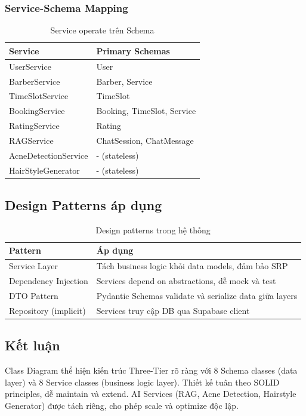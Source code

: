 \subsubsection{Service-Schema Mapping}

\begin{table}[H]
\centering
\caption{Service operate trên Schema}
\begin{tabular}{|l|l|}
\hline
\textbf{Service} & \textbf{Primary Schemas} \\
\hline
UserService & User \\
\hline
BarberService & Barber, Service \\
\hline
TimeSlotService & TimeSlot \\
\hline
BookingService & Booking, TimeSlot, Service \\
\hline
RatingService & Rating \\
\hline
RAGService & ChatSession, ChatMessage \\
\hline
AcneDetectionService & - (stateless) \\
\hline
HairStyleGenerator & - (stateless) \\
\hline
\end{tabular}
\end{table}

\vspace{0.5cm}

\subsection{Design Patterns áp dụng}

\begin{table}[H]
\centering
\caption{Design patterns trong hệ thống}
\begin{tabular}{|l|p{9cm}|}
\hline
\textbf{Pattern} & \textbf{Áp dụng} \\
\hline
Service Layer & Tách business logic khỏi data models, đảm bảo SRP \\
\hline
Dependency Injection & Services depend on abstractions, dễ mock và test \\
\hline
DTO Pattern & Pydantic Schemas validate và serialize data giữa layers \\
\hline
Repository (implicit) & Services truy cập DB qua Supabase client \\
\hline
\end{tabular}
\end{table}

\subsection{Kết luận}

Class Diagram thể hiện kiến trúc Three-Tier rõ ràng với 8 Schema classes 
(data layer) và 8 Service classes (business logic layer). 
Thiết kế tuân theo SOLID principles, dễ maintain và extend. 
AI Services (RAG, Acne Detection, Hairstyle Generator) được tách riêng, 
cho phép scale và optimize độc lập.